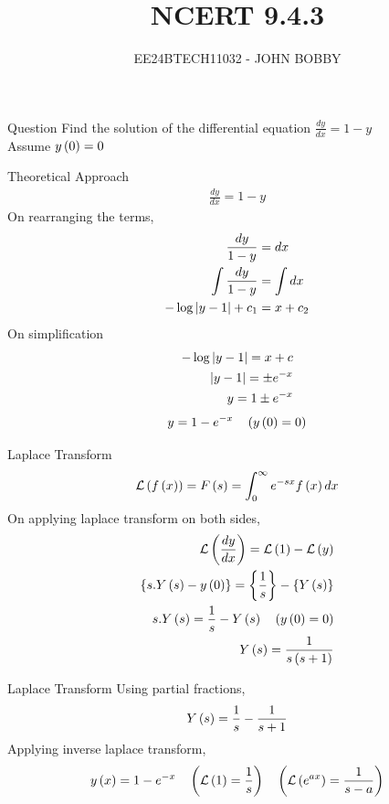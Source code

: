 \documentclass{beamer}
\begin{document}
\title{NCERT 9.4.3}
\author{EE24BTECH11032 - JOHN BOBBY}
\date{}
\frame{\titlepage}
\begin{frame}{Question}
    Find the solution of the differential equation $\frac{dy}{dx}=1-y$\\
    Assume $y\left(0\right)=0$
\end{frame}
\begin{frame}{Theoretical Approach }
\begin{align*}
    \frac{dy}{dx}=1-y
\end{align*}
On rearranging the terms,
\begin{align*}
    \frac{dy}{1-y}&=dx\\
    \int \frac{dy}{1-y}&=\int dx\\
    -\log{\left\vert y-1\right\vert}+c_1&=x+c_2
\end{align*}
On simplification 
\begin{align*}
    -\log{\left\vert y-1\right\vert}=x+c\\
    \left\vert y-1\right\vert=\pm e^{-x}\\
    y=1\pm e^{-x}
\end{align*}
 \begin{align*}
     y=1-e^{-x} \quad \left(y\left(0\right)=0\right)
 \end{align*}
\end{frame}
\begin{frame}{Laplace Transform}
\begin{align*}
    \mathcal{L}\left(f\left(x\right)\right)=F\left(s\right)= \int_{0}^{\infty} e^{-sx}f\left(x\right)dx
\end{align*}
On applying laplace transform on both sides,
\begin{align*}
    \mathcal{L}\left(\frac{dy}{dx}\right)=\mathcal{L}\left(1\right)-\mathcal{L}\left(y\right)\\
    \left\{s.Y\left(s\right)-y\left(0\right)\right\}=\left\{\frac{1}{s}\right\}-\left\{Y\left(s\right)\right\}\\
    s.Y\left(s\right)=\frac{1}{s}-Y\left(s\right) \quad \left(y\left(0\right)=0\right)\\
    Y\left(s\right)=\frac{1}{s\left(s+1\right)}
\end{align*}
\end{frame}
\begin{frame}{Laplace Transform}
    Using partial fractions,
\begin{align*}
    Y\left(s\right)=\frac{1}{s}-\frac{1}{s+1}
\end{align*}
Applying inverse laplace transform,
\begin{align*}
    y\left(x\right)=1-e^{-x} \quad \left(\mathcal{L}\left(1\right)=\frac{1}{s}\right) \quad \left(\mathcal{L}\left(e^{ax}\right)=\frac{1}{s-a}\right)
\end{align*}
\end{frame}
\end{document}
